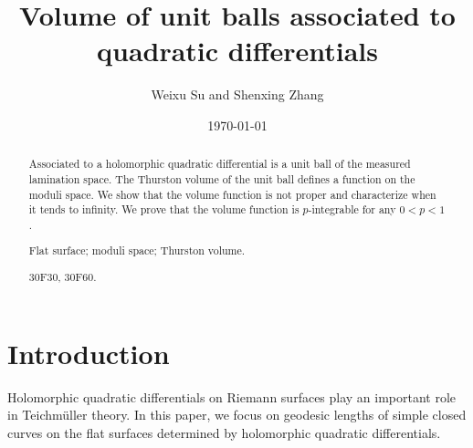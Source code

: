 \documentclass{amsart}
\theoremstyle{plain}
\theoremstyle{definition}
\numberwithin{equation}{section}
\begin{document}
\title{Volume of unit balls associated to quadratic differentials}

\author{Weixu Su and Shenxing Zhang }

\address{Weixu Su: School of Mathematics, Sun Yat-sen University, Guangzhou 510275, China}

\address{Shenxing Zhang: School of Mathematics and Statistics, Nanjing University of Science and Technology, Nanjing, 210094, China} 

\date{\today}


\maketitle



\noindent

\begin{abstract}
Associated to a holomorphic quadratic differential is a unit ball of the measured lamination space. The Thurston volume of the unit ball defines a function on the moduli space. We show that the volume function is not proper and characterize when it tends to infinity. We prove that the volume function is $p$-integrable for any $0<p<1$. 

 \medskip

 Flat surface; moduli space; Thurston volume. 

\medskip

 {30F30, 30F60.}
\end{abstract}


\section{Introduction}
 


Holomorphic quadratic differentials on Riemann surfaces play an important role in 
Teichm\"uller theory. In this paper, we focus on geodesic lengths of simple closed curves on the flat surfaces determined by holomorphic quadratic differentials.

 
\end{document}
